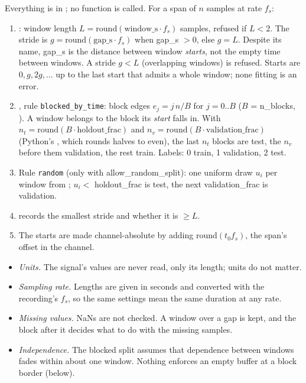 Everything is in ; no 
function is called. For a span of $n$ samples at rate $f_s$:
\begin{enumerate}
\item {}: window length $L = \mathrm{round}(\text{window\_s}\cdot f_s)$
  samples, refused if $L < 2$. The stride is $g = \mathrm{round}(\text{gap\_s}\cdot f_s)$ when
  gap\_s $> 0$, else $g = L$. Despite its name, gap\_s is the distance between window
  \emph{starts}, not the empty time between windows. A stride $g < L$ (overlapping windows)
  is refused. Starts are $0, g, 2g, \dots$ up to the last start that admits a whole window;
  none fitting is an error.
\item {}, rule \texttt{blocked\_by\_time}: block edges
  $e_j = j\,n/B$ for $j = 0..B$ ($B$ = n\_blocks, ). A window belongs to the
  block its \emph{start} falls in. With $n_t = \mathrm{round}(B\cdot\text{holdout\_frac})$
  and $n_v = \mathrm{round}(B\cdot\text{validation\_frac})$ (Python's , which
  rounds halves to even), the last $n_t$ blocks are test, the $n_v$ before them validation,
  the rest train. Labels: 0 train, 1 validation, 2 test.
\item Rule \texttt{random} (only with allow\_random\_split): one uniform draw $u_i$ per
  window from ; $u_i <$ holdout\_frac is test, the next
  validation\_frac is validation.
\item {} records the smallest stride and whether it is $\geq L$.
\item The starts are made channel-absolute by adding $\mathrm{round}(t_0 f_s)$, the span's
  offset in the channel.
\end{enumerate}

\begin{itemize}
\item \emph{Units.} The signal's values are never read, only its length; units do not matter.
\item \emph{Sampling rate.} Lengths are given in seconds and converted with the recording's
  $f_s$, so the same settings mean the same duration at any rate.
\item \emph{Missing values.} NaNs are not checked. A window over a gap is kept, and the
  block after it decides what to do with the missing samples.
\item \emph{Independence.} The blocked split assumes that dependence between windows fades
  within about one window. Nothing enforces an empty buffer at a block border (below).
\end{itemize}

